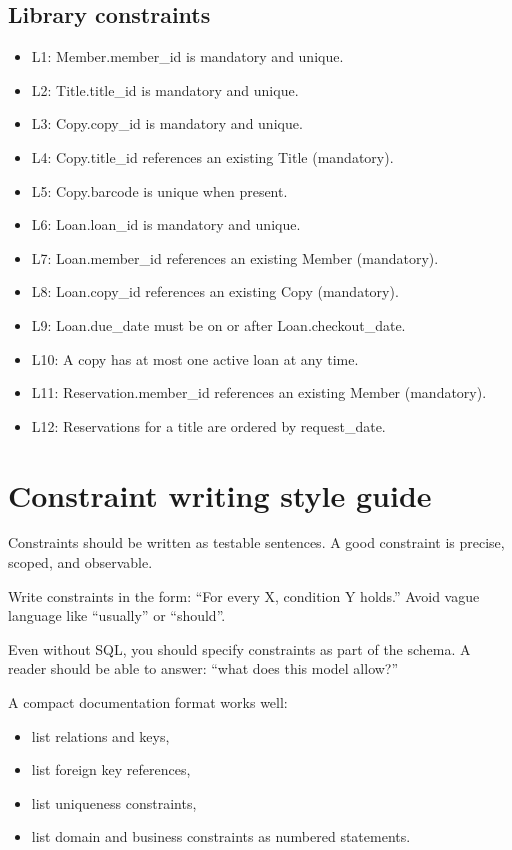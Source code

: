 \subsection{Library constraints}
\begin{itemize}[leftmargin=*,nosep]
  \item L1: Member.member\_id is mandatory and unique.
  \item L2: Title.title\_id is mandatory and unique.
  \item L3: Copy.copy\_id is mandatory and unique.
  \item L4: Copy.title\_id references an existing Title (mandatory).
  \item L5: Copy.barcode is unique when present.
  \item L6: Loan.loan\_id is mandatory and unique.
  \item L7: Loan.member\_id references an existing Member (mandatory).
  \item L8: Loan.copy\_id references an existing Copy (mandatory).
  \item L9: Loan.due\_date must be on or after Loan.checkout\_date.
  \item L10: A copy has at most one active loan at any time.
  \item L11: Reservation.member\_id references an existing Member (mandatory).
  \item L12: Reservations for a title are ordered by request\_date.
\end{itemize}

\section{Constraint writing style guide}
Constraints should be written as testable sentences.
A good constraint is precise, scoped, and observable.

Write constraints in the form: “For every X, condition Y holds.”
Avoid vague language like “usually” or “should”.

Even without SQL, you should specify constraints as part of the schema.
A reader should be able to answer: “what does this model allow?”

A compact documentation format works well:
\begin{itemize}[leftmargin=*,nosep]
  \item list relations and keys,
  \item list foreign key references,
  \item list uniqueness constraints,
  \item list domain and business constraints as numbered statements.
\end{itemize}

